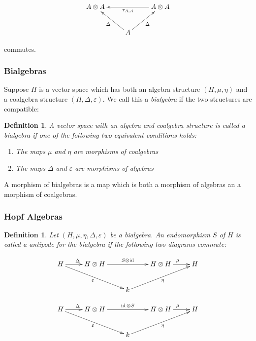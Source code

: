 \documentclass[]{article}
\newtheorem{defn}[theorem]{Definition}
\newcommand{\id}{\operatorname{id}}
\numberwithin{equation}{subsection}
\begin{document}
\begin{equation}
    \xymatrix{
    A \otimes A   & & A \ar[ll]^{\tau_{A,A}} \otimes A  \\
    & \ar[lu]^\Delta A \ar[ru]_\Delta&
    }
\end{equation}

commutes.


\subsubsection{Bialgebras}

Suppose $H$ is a vector space which has both an algebra structure $(H, \mu,
\eta)$ and a coalgebra structure $(H, \Delta, \varepsilon)$. We call this a
\emph{bialgebra} if the two structures are compatible:

\begin{defn}
    A vector space with an algebra and coalgebra structure is called a
    \emph{bialgebra} if one of the following two equivalent conditions holds:

    \begin{enumerate}
        \item The maps $\mu$ and $\eta$ are morphisms of coalgebras
        \item The maps $\Delta$ and $\varepsilon$ are morphisms of algebras
    \end{enumerate}
\end{defn}

A morphism of bialgebras is a map which is both a morphism of algebras an a
morphism of coalgebras.
\subsubsection{Hopf Algebras}


\begin{defn}
    Let $(H, \mu, \eta, \Delta, \varepsilon)$ be a bialgebra. An endomorphism
    $S$ of $H$ is called a \emph{antipode} for the bialgebra if the following
    two diagrams commute:

    \begin{equation}
        \xymatrix{
        H \ar[r]^{\Delta} \ar[rrd]_{\varepsilon}& H \otimes H \ar[rr]^{S \otimes \id} & & H \otimes H \ar[r]^{\mu} & H \\
        & & k \ar[rru]_{\eta}& &
        }
    \end{equation}

    \begin{equation}
        \xymatrix{
        H \ar[r]^{\Delta} \ar[rrd]_{\varepsilon}& H \otimes H \ar[rr]^{\id \otimes S} & & H \otimes H \ar[r]^{\mu} & H \\
        & & k \ar[rru]_{\eta}& &
        }
    \end{equation}
\end{defn}
\end{document}
